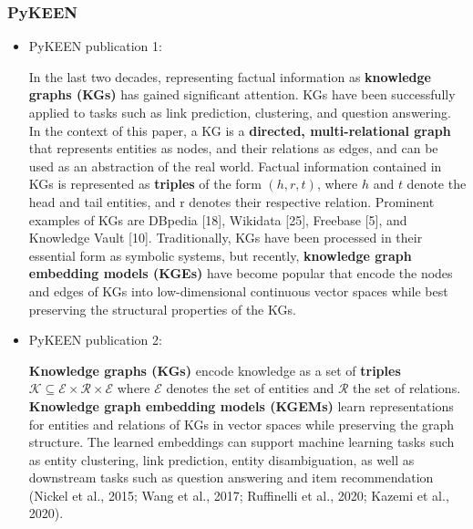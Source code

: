 \documentclass{article}
\begin{document}
\subsubsection{PyKEEN}

\begin{itemize}

\item PyKEEN publication 1:
\begin{displayquote}
In the last two decades, representing factual information as \textbf{knowledge graphs (KGs)} has gained significant attention. KGs have been successfully applied to tasks such as link prediction, clustering, and question answering. In the context of this paper, a KG is a \textbf{directed, multi-relational graph} that represents entities as nodes, and their relations as edges, and can be used as an abstraction of the real world. Factual information contained in KGs is represented as \textbf{triples} of the form $ (h, r, t) $, where $ h $ and $ t $ denote the head and tail entities, and r denotes their respective relation. Prominent examples of KGs are DBpedia [18], Wikidata [25], Freebase [5], and Knowledge Vault [10]. Traditionally, KGs have been processed in their essential form as symbolic systems, but recently, \textbf{knowledge graph embedding models (KGEs)} have become popular that encode the nodes and edges of KGs into low-dimensional continuous vector spaces while best preserving the structural properties of the KGs.
\end{displayquote}

\item PyKEEN publication 2:
\begin{displayquote}
\textbf{Knowledge graphs (KGs)} encode knowledge as a set of \textbf{triples} $ \mathcal{K} \subseteq \mathcal{E} \times \mathcal{R} \times \mathcal{E} $ where $ \mathcal{E} $ denotes the set of entities and $ \mathcal{R} $ the set of relations. \textbf{Knowledge graph embedding models (KGEMs)} learn representations for entities and relations of KGs in vector spaces while preserving the graph structure. The learned embeddings can support machine learning tasks such as entity clustering, link prediction, entity disambiguation, as well as downstream tasks such as question answering and item recommendation (Nickel et al., 2015; Wang et al., 2017; Ruffinelli et al., 2020; Kazemi et al., 2020).
\end{displayquote}

\end{itemize}
\end{document}
